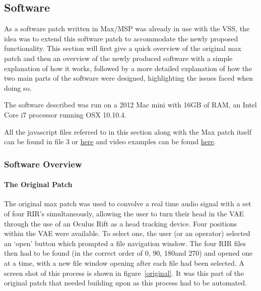 \documentclass[../../main.tex]{subfiles}
\begin{document}
\lstset{language=Java} 
	\subsection{Software}
	\label{software}
		
		As a software patch written in Max/MSP was already in use with the \ac{VSS}, the idea was to extend this software patch to accommodate the newly proposed functionality. This section will first give a quick overview of the original max patch and then an overview of the newly produced software with a simple explanation of how it works, followed by a more detailed explanation of how the two main parts of the software were designed, highlighting the issues faced when doing so.

		The software described was run on a 2012 Mac mini with 16GB of RAM, an Intel Core i7 processor running OSX 10.10.4.

		All the javascript files referred to in this section along with the Max patch itself can be found in file 3 or \href{http://lt669.github.io/pages/javascripts.html}{here} and video examples can be found \href{http://lt669.github.io/pages/videos.html}{here}.

		\subsubsection{Software Overview}

			\paragraph{The Original Patch}
			\label{softwareoverview:original}
				The original max patch was used to convolve a real time audio signal with a set of four \ac{RIR}'s simultaneously, allowing the user to turn their head in the \ac{VAE} through the use of an Oculus Rift as a head tracking device. Four positions within the \ac{VAE} were available. To select one, the user (or an operator) selected an `open' button which prompted a file navigation window. The four \ac{RIR} files then had to be found (in the correct order of 0\textdegree, 90\textdegree, 180\textdegree and 270\textdegree) and opened one at a time, with a new file window opening after each file had been selected. A screen shot of this process is shown in figure~\ref{original}. It was this part of the original patch that needed building upon as this process had to be automated.
\end{document}
